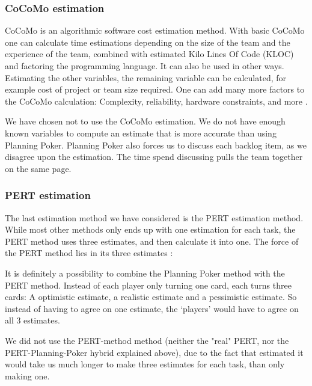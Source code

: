 \subsubsection{CoCoMo estimation}
CoCoMo is an algorithmic software cost estimation method. With basic CoCoMo one can calculate time estimations depending on the size of the team and the experience of the team, combined with estimated Kilo Lines Of Code (KLOC) and factoring the programming language. It can also be used in other ways. Estimating the other variables, the remaining variable can be calculated, for example cost of project or team size required. One can add many more factors to the CoCoMo calculation: Complexity, reliability, hardware constraints, and more \cite[p. 147]{PM}.

We have chosen not to use the CoCoMo estimation. We do not have enough known variables to compute an estimate that is more accurate than using Planning Poker. Planning Poker also forces us to discuss each backlog item, as we disagree upon the estimation. The time spend discussing pulls the team together on the same page. 

\subsubsection{PERT estimation}
The last estimation method we have considered is the PERT estimation method. While most other methods only ends up with one estimation for each task, the PERT method uses three estimates, and then calculate it into one. The force of the PERT method lies in its three estimates \cite[p. 152]{PM}:

It is definitely a possibility to combine the Planning Poker method with the PERT method. Instead of each player only turning one card, each turns three cards: A optimistic estimate, a realistic estimate and a pessimistic estimate. So instead of having to agree on one estimate, the `players' would have to agree on all 3 estimates.

We did not use the PERT-method method (neither the "real" PERT, nor the PERT-Planning-Poker hybrid explained above), due to the fact that estimated it would take us much longer to make three estimates for each task, than only making one.